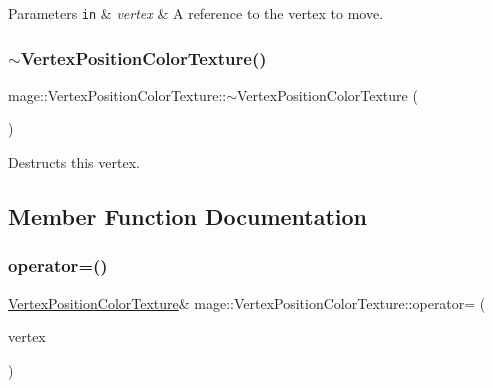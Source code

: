 \begin{DoxyParams}[1]{Parameters}
\mbox{\tt in}  & {\em vertex} & A reference to the vertex to move. \\
\hline
\end{DoxyParams}
\hypertarget{structmage_1_1_vertex_position_color_texture_a07cc697a88ef1a75ef64aadac9945c11}{}\label{structmage_1_1_vertex_position_color_texture_a07cc697a88ef1a75ef64aadac9945c11} 
\subsubsection{\texorpdfstring{$\sim$\+Vertex\+Position\+Color\+Texture()}{~VertexPositionColorTexture()}}
{\footnotesize\ttfamily mage\+::\+Vertex\+Position\+Color\+Texture\+::$\sim$\+Vertex\+Position\+Color\+Texture (\begin{DoxyParamCaption}{ }\end{DoxyParamCaption})\hspace{0.3cm}{\ttfamily [default]}}

Destructs this vertex. 

\subsection{Member Function Documentation}
\hypertarget{structmage_1_1_vertex_position_color_texture_a6b8d5ebc779ddf9f6e68dc83cb30fe0c}{}\label{structmage_1_1_vertex_position_color_texture_a6b8d5ebc779ddf9f6e68dc83cb30fe0c} 
\subsubsection{\texorpdfstring{operator=()}{operator=()}\hspace{0.1cm}{\footnotesize\ttfamily [1/2]}}
{\footnotesize\ttfamily \hyperlink{structmage_1_1_vertex_position_color_texture}{Vertex\+Position\+Color\+Texture}\& mage\+::\+Vertex\+Position\+Color\+Texture\+::operator= (\begin{DoxyParamCaption}\item[{const \hyperlink{structmage_1_1_vertex_position_color_texture}{Vertex\+Position\+Color\+Texture} \&}]{vertex }\end{DoxyParamCaption})\hspace{0.3cm}{\ttfamily [default]}}

